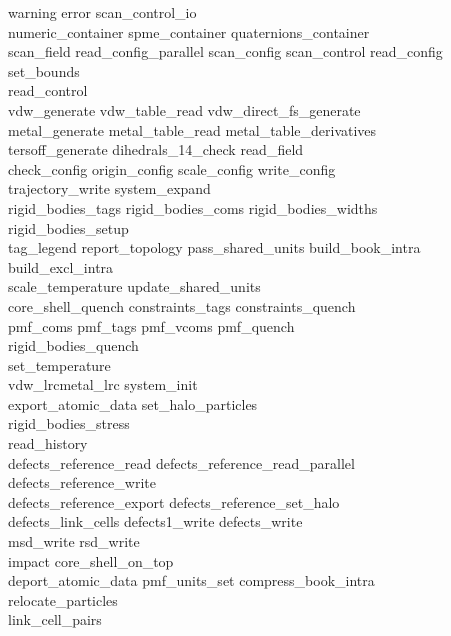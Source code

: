 \begin{itemize}
{\sc
warning error scan\_control\_io \\
numeric\_container spme\_container quaternions\_container \\
scan\_field read\_config\_parallel scan\_config scan\_control read\_config \\
set\_bounds \\
read\_control \\
vdw\_generate vdw\_table\_read vdw\_direct\_fs\_generate \\
metal\_generate metal\_table\_read metal\_table\_derivatives \\
tersoff\_generate dihedrals\_14\_check read\_field \\
check\_config origin\_config scale\_config write\_config \\
trajectory\_write system\_expand \\
rigid\_bodies\_tags rigid\_bodies\_coms rigid\_bodies\_widths \\
rigid\_bodies\_setup \\
tag\_legend report\_topology pass\_shared\_units build\_book\_intra \\
build\_excl\_intra \\
scale\_temperature update\_shared\_units \\
core\_shell\_quench constraints\_tags constraints\_quench \\
pmf\_coms pmf\_tags pmf\_vcoms pmf\_quench \\
rigid\_bodies\_quench \\
set\_temperature \\
vdw\_lrcmetal\_lrc system\_init \\
export\_atomic\_data set\_halo\_particles \\
rigid\_bodies\_stress \\
read\_history \\
defects\_reference\_read defects\_reference\_read\_parallel \\
defects\_reference\_write \\
defects\_reference\_export defects\_reference\_set\_halo \\
defects\_link\_cells defects1\_write defects\_write \\
msd\_write rsd\_write \\
impact core\_shell\_on\_top \\
deport\_atomic\_data pmf\_units\_set compress\_book\_intra \\
relocate\_particles \\
link\_cell\_pairs \\
}
\end{itemize}
